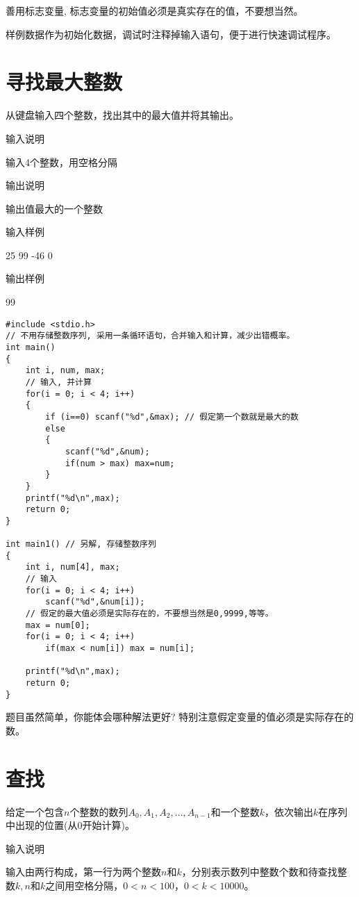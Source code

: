 \begin{note}[要点]
	善用标志变量, 标志变量的初始值必须是真实存在的值，不要想当然。
	
	样例数据作为初始化数据，调试时注释掉输入语句，便于进行快速调试程序。
\end{note}

\section{寻找最大整数}
从键盘输入四个整数，找出其中的最大值并将其输出。

输入说明

输入4个整数，用空格分隔

输出说明

输出值最大的一个整数

输入样例

25 99 -46 0

输出样例

99

\begin{lstlisting}
#include <stdio.h>
// 不用存储整数序列, 采用一条循环语句，合并输入和计算，减少出错概率。 
int main() 
{
	int i, num, max;
	// 输入, 并计算 
	for(i = 0; i < 4; i++) 
	{ 
		if (i==0) scanf("%d",&max); // 假定第一个数就是最大的数 
		else
		{
			scanf("%d",&num);
			if(num > max) max=num; 
		} 
	} 
	printf("%d\n",max);
	return 0;
} 

int main1() // 另解, 存储整数序列
{
	int i, num[4], max;
	// 输入 
	for(i = 0; i < 4; i++) 
		scanf("%d",&num[i]);
	// 假定的最大值必须是实际存在的，不要想当然是0,9999,等等。
	max = num[0]; 
	for(i = 0; i < 4; i++)  
		if(max < num[i]) max = num[i];
	
	printf("%d\n",max);
	return 0;
} 
\end{lstlisting}

\begin{note}[要点]
	题目虽然简单，你能体会哪种解法更好? 特别注意假定变量的值必须是实际存在的数。
\end{note}

\section{查找}	
给定一个包含$n$个整数的数列$A_0, A_1, A_2, \dots, A_{n-1}$和一个整数$k$，依次输出$k$在序列中出现的位置(从0开始计算)。

输入说明	

输入由两行构成，第一行为两个整数$n$和$k$，分别表示数列中整数个数和待查找整数$k,n$和$k$之间用空格分隔，$0<n<100，0<k<10000$。


